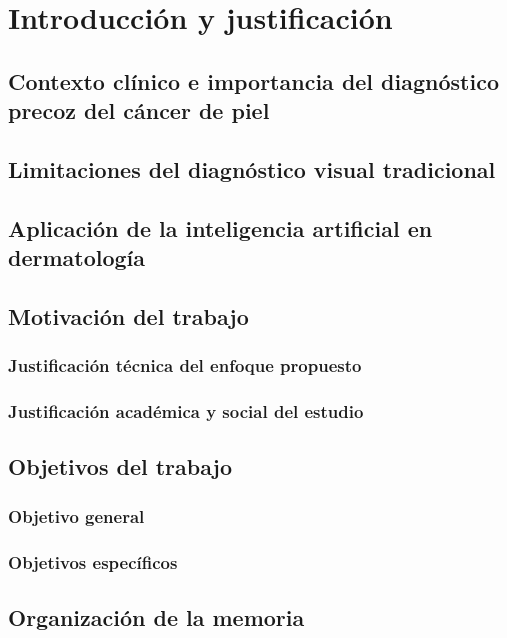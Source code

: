 \chapter{Introducción y justificación}
\section{Contexto clínico e importancia del diagnóstico precoz del cáncer de piel}
\section{Limitaciones del diagnóstico visual tradicional}
\section{Aplicación de la inteligencia artificial en dermatología}
\section{Motivación del trabajo}
\subsection{Justificación técnica del enfoque propuesto}
\subsection{Justificación académica y social del estudio}
\section{Objetivos del trabajo}
\subsection{Objetivo general}
\subsection{Objetivos específicos}
\section{Organización de la memoria}